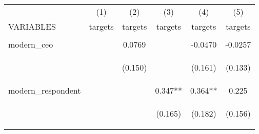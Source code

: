 \begin{center}
\begin{tabular}{lccccc} \hline
 & (1) & (2) & (3) & (4) & (5) \\
VARIABLES & targets & targets & targets & targets & targets \\ \hline
\vspace{4pt} & \begin{footnotesize}\end{footnotesize} & \begin{footnotesize}\end{footnotesize} & \begin{footnotesize}\end{footnotesize} & \begin{footnotesize}\end{footnotesize} & \begin{footnotesize}\end{footnotesize} \\
modern\_ceo &  & 0.0769 &  & -0.0470 & -0.0257 \\
\vspace{4pt} & \begin{footnotesize}\end{footnotesize} & \begin{footnotesize}(0.150)\end{footnotesize} & \begin{footnotesize}\end{footnotesize} & \begin{footnotesize}(0.161)\end{footnotesize} & \begin{footnotesize}(0.133)\end{footnotesize} \\
modern\_respondent &  &  & 0.347** & 0.364** & 0.225 \\
\vspace{4pt} & \begin{footnotesize}\end{footnotesize} & \begin{footnotesize}\end{footnotesize} & \begin{footnotesize}(0.165)\end{footnotesize} & \begin{footnotesize}(0.182)\end{footnotesize} & \begin{footnotesize}(0.156)\end{footnotesize} \\

\end{tabular}
\end{center}
